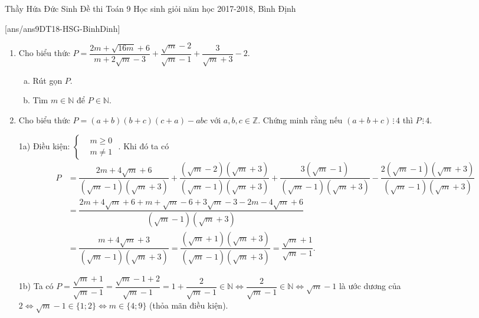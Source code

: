 \begin{name}
{Thầy Hứa Đức Sinh}
{Đề thi Toán 9 Học sinh giỏi năm học 2017-2018, Bình Định}
\end{name}
\setcounter{ex}{0}
[ans/ans9DT18-HSG-BinhDinh]
\begin{ex}%
	\begin{enumerate}[1)]
		\item Cho biểu thức $P = \dfrac{2m+\sqrt{16m}+6}{m+2\sqrt{m}-3} + \dfrac{\sqrt{m}-2}{\sqrt{m}-1} + \dfrac{3}{\sqrt{m}+3} - 2$.
			\begin{enumerate}[a)]
				\item Rút gọn $P$.
				\item Tìm $m \in \mathbb{N}$ để $P \in \mathbb{N}$.
			\end{enumerate}
		\item Cho biểu thức $P = (a+b)(b+c)(c+a) - abc$ với $a,b,c \in \mathbb{Z}$. Chứng minh rằng nếu $(a+b+c) \, \vdots \, 4$ thì $P \, \vdots \, 4$.
	\end{enumerate}
	\loigiai
	{
		\begin{enumerate}
			\item[1a)] Điều kiện: $\left\{\begin{aligned} &m \ge 0 \\ &m \neq 1 \end{aligned}\right.$ . Khi đó ta có
				\begin{align*}
					P&=\dfrac{2m+4\sqrt{m}+6}{\left(\sqrt{m}-1\right)\left(\sqrt{m}+3\right)}+\dfrac{\left(\sqrt{m}-2\right)\left(\sqrt{m}+3\right)}{\left(\sqrt{m}-1\right)\left(\sqrt{m}+3\right)}+\dfrac{3\left(\sqrt{m}-1\right)}{\left(\sqrt{m}-1\right)\left(\sqrt{m}+3\right)}-\dfrac{2\left(\sqrt{m}-1\right)\left(\sqrt{m}+3\right)}{\left(\sqrt{m}-1\right)\left(\sqrt{m}+3\right)} \\
					&=\dfrac{2m+4\sqrt{m}+6+m+\sqrt{m}-6+3\sqrt{m}-3-2m-4\sqrt{m}+6}{\left(\sqrt{m}-1\right)\left(\sqrt{m}+3\right)} \\
					&=\dfrac{m+4\sqrt{m}+3}{\left(\sqrt{m}-1\right)\left(\sqrt{m}+3\right)}=\dfrac{\left(\sqrt{m}+1\right)\left(\sqrt{m}+3\right)}{\left(\sqrt{m}-1\right)\left(\sqrt{m}+3\right)}=\dfrac{\sqrt{m}+1}{\sqrt{m}-1}.
				\end{align*}
			\item[1b)] Ta có $P=\dfrac{\sqrt{m}+1}{\sqrt{m}-1}=\dfrac{\sqrt{m}-1+2}{\sqrt{m}-1}=1+\dfrac{2}{\sqrt{m}-1} \in \mathbb{N} \Leftrightarrow \dfrac{2}{\sqrt{m} - 1} \in \mathbb{N} \Leftrightarrow \sqrt{m} - 1$ là ước dương của $2 \Leftrightarrow \sqrt{m}-1 \in \{1;2\} \Leftrightarrow m \in \{4;9\}$ (thỏa mãn điều kiện). \\

\end{enumerate}}
\end{ex}
